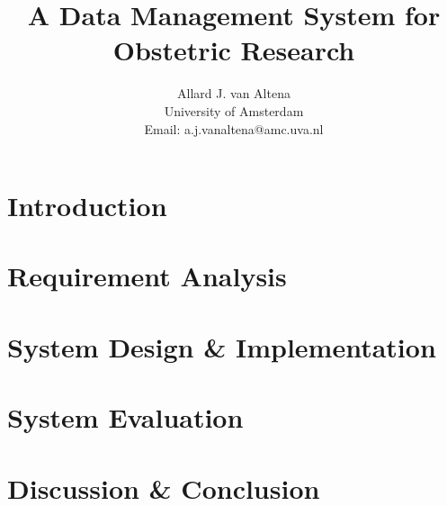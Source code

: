 \documentclass[a4paper]{report}
\title{A Data Management System for Obstetric Research}
\author{
	Allard J. van Altena\\
	University of Amsterdam\\
	Email: a.j.vanaltena@amc.uva.nl
}
\begin{document}
	
	\tableofcontents
	
	\chapter{Introduction}
	\label{introduction}
	
	
	
	
	
	\chapter{Requirement Analysis}
	\label{requirements}
	
	
	
	
	
	
	
	
	
	
	
	
	\chapter{System Design \& Implementation}
	\label{system-functionality}
	
	
	
	
	
	
	
	
	
	
	\chapter{System Evaluation}
	\label{evaluation}
	
	
	
	
	\chapter{Discussion \& Conclusion}
	\label{discussion}
	
\end{document}
